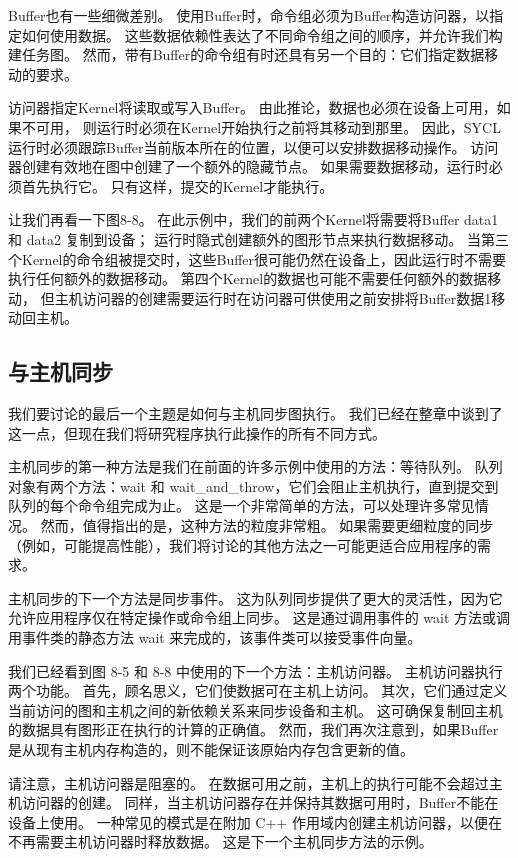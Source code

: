 Buffer也有一些细微差别。 使用Buffer时，命令组必须为Buffer构造访问器，以指定如何使用数据。 
这些数据依赖性表达了不同命令组之间的顺序，并允许我们构建任务图。 
然而，带有Buffer的命令组有时还具有另一个目的：它们指定数据移动的要求。

访问器指定Kernel将读取或写入Buffer。 由此推论，数据也必须在设备上可用，如果不可用，
则运行时必须在Kernel开始执行之前将其移动到那里。 
因此，SYCL 运行时必须跟踪Buffer当前版本所在的位置，以便可以安排数据移动操作。 
访问器创建有效地在图中创建了一个额外的隐藏节点。 如果需要数据移动，运行时必须首先执行它。 
只有这样，提交的Kernel才能执行。

让我们再看一下图8-8。 在此示例中，我们的前两个Kernel将需要将Buffer data1 和 data2 复制到设备； 
运行时隐式创建额外的图形节点来执行数据移动。 
当第三个Kernel的命令组被提交时，这些Buffer很可能仍然在设备上，因此运行时不需要执行任何额外的数据移动。 
第四个Kernel的数据也可能不需要任何额外的数据移动，
但主机访问器的创建需要运行时在访问器可供使用之前安排将Buffer数据1移动回主机。

\subsection{与主机同步}
我们要讨论的最后一个主题是如何与主机同步图执行。 
我们已经在整章中谈到了这一点，但现在我们将研究程序执行此操作的所有不同方式。

主机同步的第一种方法是我们在前面的许多示例中使用的方法：等待队列。 
队列对象有两个方法：wait 和 wait\_and\_throw，它们会阻止主机执行，直到提交到队列的每个命令组完成为止。 
这是一个非常简单的方法，可以处理许多常见情况。 然而，值得指出的是，这种方法的粒度非常粗。 
如果需要更细粒度的同步（例如，可能提高性能），我们将讨论的其他方法之一可能更适合应用程序的需求。

主机同步的下一个方法是同步事件。 这为队列同步提供了更大的灵活性，因为它允许应用程序仅在特定操作或命令组上同步。 
这是通过调用事件的 wait 方法或调用事件类的静态方法 wait 来完成的，该事件类可以接受事件向量。

我们已经看到图 8-5 和 8-8 中使用的下一个方法：主机访问器。 主机访问器执行两个功能。 
首先，顾名思义，它们使数据可在主机上访问。 其次，它们通过定义当前访问的图和主机之间的新依赖关系来同步设备和主机。 
这可确保复制回主机的数据具有图形正在执行的计算的正确值。 
然而，我们再次注意到，如果Buffer是从现有主机内存构造的，则不能保证该原始内存包含更新的值。

请注意，主机访问器是阻塞的。 在数据可用之前，主机上的执行可能不会超过主机访问器的创建。 
同样，当主机访问器存在并保持其数据可用时，Buffer不能在设备上使用。 
一种常见的模式是在附加 C++ 作用域内创建主机访问器，以便在不再需要主机访问器时释放数据。 
这是下一个主机同步方法的示例。

